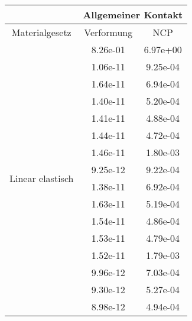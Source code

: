 \begin{table} 
\centering 
\begin{tabular}{c|cc|} 
\cline{2-3} 
 & \multicolumn{2}{|c|}{Allgemeiner Kontakt} \\ 
\hline 
\multicolumn{1}{|c|}{Materialgesetz} & \multicolumn{1}{c|}{Verformung} & \multicolumn{1}{c|}{NCP} \\ 
\hline 
\multicolumn{1}{|c|}{\multirow{101}{*}{Linear elastisch}} &\multicolumn{1}{|c|}{  8.26e-01} & \multicolumn{1}{|c|}{  6.97e+00} \\ 
\multicolumn{1}{|c|}{} & \multicolumn{1}{|c|}{  1.06e-11} & \multicolumn{1}{|c|}{  9.25e-04} \\ 
\multicolumn{1}{|c|}{} & \multicolumn{1}{|c|}{  1.64e-11} & \multicolumn{1}{|c|}{  6.94e-04} \\ 
\multicolumn{1}{|c|}{} & \multicolumn{1}{|c|}{  1.40e-11} & \multicolumn{1}{|c|}{  5.20e-04} \\ 
\multicolumn{1}{|c|}{} & \multicolumn{1}{|c|}{  1.41e-11} & \multicolumn{1}{|c|}{  4.88e-04} \\ 
\multicolumn{1}{|c|}{} & \multicolumn{1}{|c|}{  1.44e-11} & \multicolumn{1}{|c|}{  4.72e-04} \\ 
\multicolumn{1}{|c|}{} & \multicolumn{1}{|c|}{  1.46e-11} & \multicolumn{1}{|c|}{  1.80e-03} \\ 
\multicolumn{1}{|c|}{} & \multicolumn{1}{|c|}{  9.25e-12} & \multicolumn{1}{|c|}{  9.22e-04} \\ 
\multicolumn{1}{|c|}{} & \multicolumn{1}{|c|}{  1.38e-11} & \multicolumn{1}{|c|}{  6.92e-04} \\ 
\multicolumn{1}{|c|}{} & \multicolumn{1}{|c|}{  1.63e-11} & \multicolumn{1}{|c|}{  5.19e-04} \\ 
\multicolumn{1}{|c|}{} & \multicolumn{1}{|c|}{  1.54e-11} & \multicolumn{1}{|c|}{  4.86e-04} \\ 
\multicolumn{1}{|c|}{} & \multicolumn{1}{|c|}{  1.53e-11} & \multicolumn{1}{|c|}{  4.79e-04} \\ 
\multicolumn{1}{|c|}{} & \multicolumn{1}{|c|}{  1.52e-11} & \multicolumn{1}{|c|}{  1.79e-03} \\ 
\multicolumn{1}{|c|}{} & \multicolumn{1}{|c|}{  9.96e-12} & \multicolumn{1}{|c|}{  7.03e-04} \\ 
\multicolumn{1}{|c|}{} & \multicolumn{1}{|c|}{  9.30e-12} & \multicolumn{1}{|c|}{  5.27e-04} \\ 
\multicolumn{1}{|c|}{} & \multicolumn{1}{|c|}{  8.98e-12} & \multicolumn{1}{|c|}{  4.94e-04} \\ 

\end{tabular}
\end{table}
